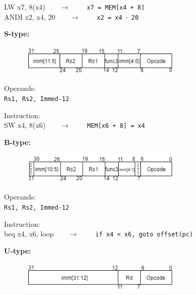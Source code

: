 \begin{description}
\begin{description}
		\textsf{LW x7, 8(x4)}\ \ \ \ $\longrightarrow$ \ \ \ \ \texttt{x7 = MEM[x4 + 8]} \\
    \textsf{ANDI x2, x4, 20}\ \ \ \ $\longrightarrow$ \ \ \ \ \texttt{x2 = x4 $\cdot$ 20}
	\end{description}
	\item \textbf{S-type:}
  \begin{figure}[h]
    \center
    \includegraphics[width=0.7\textwidth]{sec1/images/Stype.png}
  \end{figure}
	\begin{description}
		\item Operands:\\
		\texttt{Rs1, Rs2, Immed-12}
		\item Instruction:\\
		\textsf{SW x4, 8(x6)}\ \ \ \ $\longrightarrow$ \ \ \ \ \texttt{MEM[x6 + 8] = x4}\\
	\end{description}
  \item \textbf{B-type:}
  \begin{figure}[h]
    \center
    \includegraphics[width=0.7\textwidth]{sec1/images/Btype.png}
  \end{figure}
	\begin{description}
		\item Operands:\\
		\texttt{Rs1, Rs2, Immed-12}
		\item Instruction:\\
		\textsf{beq x4, x6, loop}\ \ \ \ $\longrightarrow$ \ \ \ \ \texttt{if x4 < x6, goto offset(pc)}
	\end{description}
	\item \textbf{U-type:}
  \begin{figure}[h]
    \center
    \includegraphics[width=0.7\textwidth]{sec1/images/Utype.png}

\end{figure}
\end{description}
